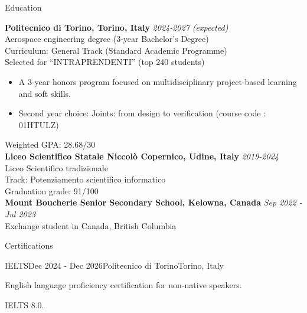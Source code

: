 \documentclass[
	11pt, %
]{resume} %
\begin{document}

\begin{rSection}{Education}
	
	\textbf{Politecnico di Torino, Torino, Italy} \hfill \textit{2024-2027 (expected)} \\ 
	Aerospace engineering degree (3-year Bachelor's Degree)\\
	Curriculum: General Track (Standard Academic Programme) \\
	Selected for ``INTRAPRENDENTI'' (top 240 students)
	\begin{itemize}
		\item A 3-year honors program focused on multidisciplinary project-based learning and soft skills.
		\item Second year choice: Joints: from design to verification (course code : 01HTULZ)
	\end{itemize}
	Weighted GPA: 28.68/30 \\

	\textbf{Liceo Scientifico Statale Niccolò Copernico, Udine, Italy} \hfill \textit{2019-2024} \\ 
	Liceo Scientifico tradizionale\\
	Track: Potenziamento scientifico informatico\\
	Graduation grade: 91/100 \\

	\textbf{Mount Boucherie Senior Secondary School, Kelowna, Canada} \hfill \textit{Sep 2022 - Jul 2023} \\ 
	Exchange student in Canada, British Columbia \\
	
\end{rSection}


\begin{rSection}{Certifications}

	\begin{rSubsection}{IELTS}{Dec 2024 - Dec 2026}{Politecnico di Torino}{Torino, Italy}
		\item English language proficiency certification for non-native speakers.
		\item IELTS 8.0.
	\end{rSubsection}

\end{rSection}
\end{document}
